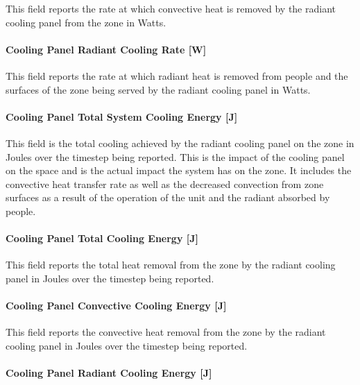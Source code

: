 This field reports the rate at which convective heat is removed by the radiant cooling panel from the zone in Watts.

\paragraph{Cooling Panel Radiant Cooling Rate [W]}\label{cooling-panel-radiant-cooling-rate-w}

This field reports the rate at which radiant heat is removed from people and the surfaces of the zone being served by the radiant cooling panel in Watts.

\paragraph{Cooling Panel Total System Cooling Energy [J]}\label{cooling-panel-total-system-cooling-energy-j}

This field is the total cooling achieved by the radiant cooling panel on the zone in Joules over the timestep being reported. This is the impact of the cooling panel on the space and is the actual impact the system has on the zone.  It includes the convective heat transfer rate as well as the decreased convection from zone surfaces as a result of the operation of the unit and the radiant absorbed by people.

\paragraph{Cooling Panel Total Cooling Energy [J]}\label{cooling-panel-total-cooling-energy-j}

This field reports the total heat removal from the zone by the radiant cooling panel in Joules over the timestep being reported.

\paragraph{Cooling Panel Convective Cooling Energy [J]}\label{cooling-panel-convective-cooling-energy-j}

This field reports the convective heat removal from the zone by the radiant cooling panel in Joules over the timestep being reported.

\paragraph{Cooling Panel Radiant Cooling Energy [J]}\label{cooling-panel-radiant-cooling-energy-j}

